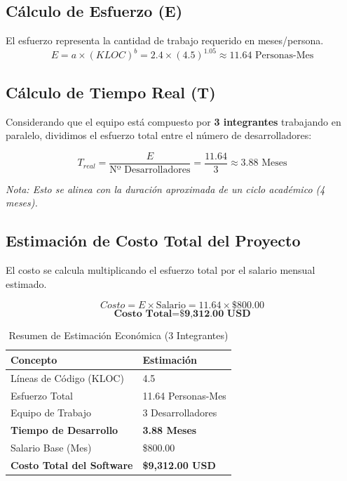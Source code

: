 \documentclass[12pt, a4paper]{article}
\begin{document}
\subsection{Cálculo de Esfuerzo (E)}
El esfuerzo representa la cantidad de trabajo requerido en meses/persona.
\[ E = a \times (KLOC)^b = 2.4 \times (4.5)^{1.05} \approx 11.64 \text{ Personas-Mes} \]

\subsection{Cálculo de Tiempo Real (T)}
Considerando que el equipo está compuesto por \textbf{3 integrantes} trabajando en paralelo, dividimos el esfuerzo total entre el número de desarrolladores:

\[ T_{real} = \frac{E}{\text{Nº Desarrolladores}} = \frac{11.64}{3} \approx 3.88 \text{ Meses} \]

\textit{Nota: Esto se alinea con la duración aproximada de un ciclo académico (4 meses).}

\subsection{Estimación de Costo Total del Proyecto}
El costo se calcula multiplicando el esfuerzo total por el salario mensual estimado.

\[ Costo = E \times \text{Salario} = 11.64 \times \$800.00 \]
\[ \textbf{Costo Total} = \textbf{\$9,312.00 USD} \]

\begin{table}[H]
	\centering
	\begin{tabular}{ll}
		\toprule
		\textbf{Concepto} & \textbf{Estimación} \\
		\midrule
		Líneas de Código (KLOC) & 4.5 \\
		Esfuerzo Total & 11.64 Personas-Mes \\
		Equipo de Trabajo & 3 Desarrolladores \\
		\textbf{Tiempo de Desarrollo} & \textbf{3.88 Meses} \\
		Salario Base (Mes) & \$800.00 \\
		\textbf{Costo Total del Software} & \textbf{\$9,312.00 USD} \\
		\bottomrule
	\end{tabular}
	\caption{Resumen de Estimación Económica (3 Integrantes)}
\end{table}
	
\end{document}
